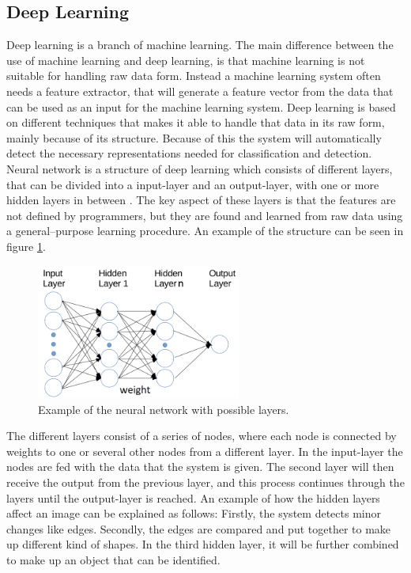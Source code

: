 \subsection{Deep Learning}
Deep learning is a branch of machine learning. The main difference between the use of machine learning and deep learning, is that machine learning is not suitable for handling raw data form. Instead a machine learning system often needs a feature extractor, that will generate a feature vector from the data that can be used as an input for the machine learning system.
Deep learning is based on different techniques that makes it able to handle that data in its raw form, mainly because of its structure.\citep{LeCun2015, Schmidhuber2015} Because of this the system will automatically detect the necessary representations needed for classification and detection. Neural network is a structure of deep learning which consists of different layers, that can be divided into a input-layer and an output-layer, with one or more hidden layers in between \citep{Schmidhuber2015}. The key aspect of these layers is that the features are not defined by programmers, but they are found and learned from raw data using a general–purpose learning procedure.\citep{LeCun2015} An example of the structure can be seen in figure \ref{fig:NN_structure}.   


\begin{figure} [H]
\centering
\includegraphics[width=0.6\textwidth]{figures/NN_structure}
\caption{Example of the neural network with possible layers\citep{Acquarelli2017}.}
\label{fig:NN_structure}  
\end{figure}

\noindent
The different layers consist of a series of nodes, where each node is connected by weights to one or several other nodes from a different layer. In the input-layer the nodes are fed with the data that the system is given. The second layer will then receive the output from the previous layer, and this process continues through the layers until the output-layer is reached.\citep{Schmidhuber2015} An example of how the hidden layers affect an image can be explained as follows:  
Firstly, the system detects minor changes like edges. Secondly, the edges are compared and put together to make up different kind of shapes. In the third hidden layer, it will be further combined to make up an object that can be identified.\citep{LeCun2015}


